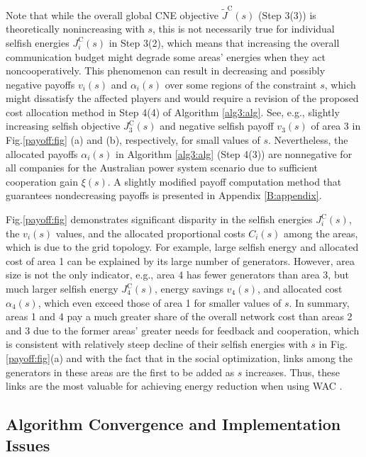 \documentclass[12pt, draftclsnofoot,onecolumn]{IEEEtran}
\begin{document}
Note that while the overall global CNE objective $\tilde J^{\mathrm{C}}(s)$ (Step 3(3)) is theoretically nonincreasing with $s$, this is not necessarily true for individual selfish energies $J_i^{\mathrm{C}}(s)$ in Step 3(2), which means that increasing the overall communication budget might degrade some areas' energies when they act noncooperatively. This phenomenon can result in decreasing and possibly negative payoffs $v_i(s)$ and $\alpha_i(s)$ over some regions of the constraint $s$, which might dissatisfy the affected players and would require a revision of the proposed cost allocation method in Step 4(4) of Algorithm \ref{alg3:alg}. See, e.g., slightly increasing selfish objective $J_3^{\mathrm{C}}(s)$ and negative selfish payoff $v_3(s)$ of area 3 in Fig.{\ref{payoff:fig}} (a) and (b), respectively, for small values of $s$. Nevertheless, the allocated payoffs $\alpha_i(s)$ in Algorithm \ref{alg3:alg} (Step 4(3)) are nonnegative for all companies for the Australian power system scenario due to sufficient cooperation gain $\xi(s)$. A slightly modified payoff computation method that guarantees nondecreasing payoffs is presented in Appendix \ref{B:appendix}.

Fig.\ref{payoff:fig} demonstrates significant disparity in the selfish energies $J_i^{\mathrm{C}}(s)$, the $v_i(s)$ values, and the allocated proportional costs $C_i(s)$ among the areas, which is due to the grid topology. For example, large selfish energy and allocated cost of area 1 can be explained by its large number of generators. However, area size is not the only indicator, e.g., area 4 has fewer generators than area 3, but much larger selfish energy $J_4^{\mathrm{C}}(s)$, energy savings $v_4(s)$, and allocated cost $\alpha_4(s)$, which even exceed those of area 1 for smaller values of $s$. In summary, areas 1 and 4 pay a much greater share of the overall network cost than areas 2 and 3 due to the former areas' greater needs for feedback and cooperation, which is consistent with relatively steep decline of their selfish energies with $s$ in Fig.\ref{payoff:fig}(a) and with the fact that in the social optimization, links among the generators in these areas are the first to be added as $s$ increases. Thus, these links are the most valuable for achieving energy reduction when using WAC \cite{dorjovchebulTPS14}.


\subsection{Algorithm Convergence and Implementation Issues}
\label{convergence:sec}
\end{document}
